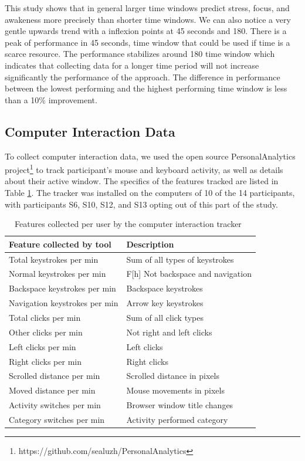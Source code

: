This study
shows that in general larger time windows predict stress,
focus, and awakeness more precisely than 
shorter time windows. We can also notice
a very gentle upwards trend
with a inflexion points at 45 seconds and 180.
There is a peak of performance in 45 seconds, 
time window that could be used if time is a scarce resource.
The performance stabilizes around 180 time window
which indicates that collecting data for a longer time
period will not increase significantly the performance of the approach.
The difference in performance between the 
lowest performing and the highest performing time window is 
less than a 10\% improvement. 


\subsection{Computer Interaction Data} \label{secCI}

To collect computer interaction data, we used the open source PersonalAnalytics project\footnote{https://github.com/sealuzh/PersonalAnalytics}  \cite{meyer18} to track participant's mouse and keyboard activity, as well as details about their active window. The specifics of the features tracked are listed in Table \ref{tracker}. The tracker was installed on the computers of 10 of the 14 participants, with participants S6, S10, S12, and S13 opting out of this part of the study. 

\begin{table}
\begin{center}
\begin{tabular}{l l}
\hline

Feature collected by tool& Description \\ 
\hline
Total keystrokes per min& Sum of all types of keystrokes \\ 
Normal keystrokes per min&F[h] Not backspace and navigation \\ 
Backspace keystrokes per min& Backspace keystrokes \\ 
Navigation keystrokes per min& Arrow key keystrokes \\ 
Total clicks per min& Sum of all click types \\ 
Other clicks per min& Not right and left clicks \\ 
Left clicks per min& Left clicks \\ 
Right clicks per min& Right clicks \\ 
Scrolled distance per min& Scrolled distance in pixels \\ 
Moved distance per min& Mouse movements in pixels \\ 
Activity switches per min& Browser window title changes \\ 
Category switches per min& Activity performed category \\ 
\hline
\end{tabular}
\caption{Features collected per user by the computer interaction tracker~\cite{meyer18}}
\label{tracker}
\end{center}
\end{table}

